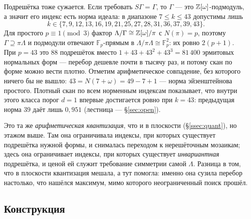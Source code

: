 Подрешётка тоже сужается. Если требовать $S\Gamma=\Gamma$, то $\Gamma$ ---
это $\mathbb{Z}[\omega]$-подмодуль, а значит его индекс есть норма идеала:
в диапазоне $7\le k\le43$ допустимы лишь
\[
k\in\{7,9,12,13,16,19,21,25,27,28,31,36,37,39,43\}.
\]
Для простого
$p\equiv1\pmod3$ фактор $\Lambda/\Gamma\cong\mathbb{Z}[\omega]/\pi$ с $N(\pi)=p$,
поэтому $\Gamma\supseteq\pi\Lambda$ и подмодули отвечают $\mathbb F_p$-прямым
в $\Lambda/\pi\Lambda\cong\mathbb F_p^2$: их ровно $2(p+1)$. При $p=43$ это
$88$ подрешёток вместо $1+43+43^2+43^3=81\,400$ эрмитовых нормальных форм ---
перебор дешевле почти в тысячу раз, и потому скан по форме можно вести
плотно. Отметим арифметическое совпадение, без которого ничего бы не вышло:
$43=N(7+\omega)=49-7+1$ --- норма эйзенштейнова простого. Плотный скан по всем
норменным индексам показывает, что внутри этого класса порог $d=1$ впервые
достигается ровно при $k=43$: предыдущая норма $39$ даёт лишь $0{,}951$
(лестница --- \S\ref{sec:open}).

Это та же \emph{арифметическая квантизация}, что и в плоскости
(\S\ref{ssec:quant}), но этажом выше. Там она ограничивала индексы, при
которых существует подрешётка нужной формы, и снималась переходом к
нерешёточным мозаикам; здесь она ограничивает индексы, при которых существует
\emph{инвариантная} подрешётка, и ценой ей служит требование симметрии самой
$\Lambda$. Разница в том, что в плоскости квантизация мешала, а тут помогла:
именно она сузила перебор настолько, что нашёлся максимум, мимо которого
неограниченный поиск прошёл.


\subsection{Конструкция}\label{ssec:constr43}

